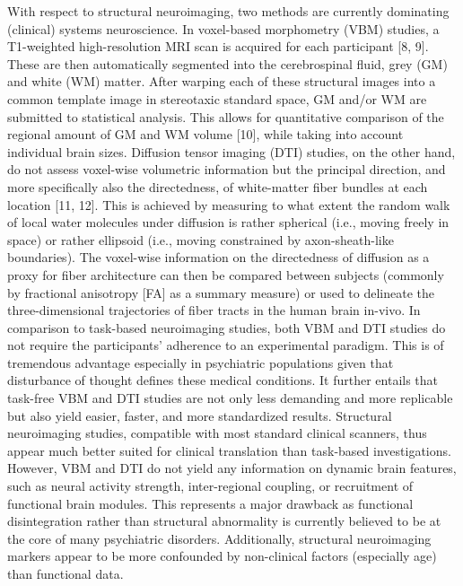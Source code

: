 \documentclass[authoryear,review,3p]{elsarticle}
\begin{document}
With respect to structural neuroimaging, two methods are currently dominating (clinical) systems neuroscience. In voxel-based morphometry (VBM) studies, a T1-weighted high-resolution MRI scan is acquired for each participant [8, 9]. These are then automatically segmented into the cerebrospinal fluid, grey (GM) and white (WM) matter. After warping each of these structural images into a common template image in stereotaxic standard space, GM and/or WM are submitted to statistical analysis. This allows for quantitative comparison of the regional amount of GM and WM volume [10], while taking into account individual brain sizes. Diffusion tensor imaging (DTI) studies, on the other hand, do not assess voxel-wise volumetric information but the principal direction, and more specifically also the directedness, of white-matter fiber bundles at each location [11, 12]. This is achieved by measuring to what extent the random walk of local water molecules under diffusion is rather spherical (i.e., moving freely in space) or rather ellipsoid (i.e., moving constrained by axon-sheath-like boundaries). The voxel-wise information on the directedness of diffusion as a proxy for fiber architecture can then be compared between subjects (commonly by fractional anisotropy [FA] as a summary measure) or used to delineate the three-dimensional trajectories of fiber tracts in the human brain in-vivo.
In comparison to task-based neuroimaging studies, both VBM and DTI studies do not require the participants' adherence to an experimental paradigm. This is of tremendous advantage especially in psychiatric populations given that disturbance of thought defines these medical conditions. It further entails that task-free VBM and DTI studies are not only less demanding and more replicable but also yield easier, faster, and more standardized results. Structural neuroimaging studies, compatible with most standard clinical scanners, thus appear much better suited for clinical translation than task-based investigations. However, VBM and DTI do not yield any information on dynamic brain features, such as neural activity strength, inter-regional coupling, or recruitment of functional brain modules. This represents a major drawback as functional disintegration rather than structural abnormality is currently believed to be at the core of many psychiatric disorders. Additionally, structural neuroimaging markers appear to be more confounded by non-clinical factors (especially age) than functional data.
\end{document}
